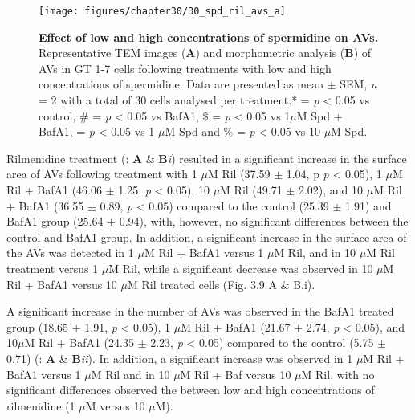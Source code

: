 {\begin{landscape}
\begin{figure}[!htbp]
\center
  \texttt{[image: figures/chapter30/30\_spd\_ril\_avs\_a]}
  \caption[Effect of low and high concentrations of spermidine on AVs]{\textbf{Effect of low and high concentrations of spermidine on AVs.} Representative TEM images (\textbf{A}) and morphometric analysis (\textbf{B}) of AVs in GT 1-7 cells following treatments with low and high concentrations of spermidine. Data are presented as mean $\pm$ SEM, \textit{n} = 2 with a total of 30 cells analysed per treatment.* = \textit{p} < 0.05 vs control, \# = \textit{p} < 0.05 vs BafA1, \$ = \textit{p} < 0.05 vs 1$\mu$M Spd + BafA1, \@ = \textit{p} < 0.05 vs 1 $\mu$M Spd and  \% = \textit{p} < 0.05 vs 10 $\mu$M Spd.}
  \label{fig:30_spd_ril_avs_a}
\end{figure} 
\end{landscape}

Rilmenidine treatment (: \textbf{A} \& \textbf{B}\textit{i}) resulted in a significant increase in the surface area of AVs following treatment with 1 $\mu$M Ril (37.59 $\pm$ 1.04, p \textit{p} < 0.05), 1 $\mu$M Ril + BafA1 (46.06 $\pm$ 1.25, \textit{p} < 0.05), 10 $\mu$M Ril (49.71 $\pm$ 2.02), and 10 $\mu$M Ril + BafA1 (36.55 $\pm$ 0.89, \textit{p} < 0.05) compared to the control (25.39 $\pm$ 1.91) and BafA1 group (25.64 $\pm$ 0.94), with, however, no significant differences between the control and BafA1 group. In addition, a significant increase in the surface area of the AVs was detected in 1 $\mu$M Ril + BafA1 versus 1 $\mu$M Ril, and in 10 $\mu$M Ril treatment versus 1 $\mu$M Ril, while a significant decrease was observed in 10 $\mu$M Ril + BafA1 versus 10 $\mu$M Ril  treated cells (Fig. 3.9 A \& B.i).

A significant increase in the number of AVs was observed in the BafA1 treated group (18.65 $\pm$ 1.91, \textit{p} < 0.05), 1 $\mu$M Ril + BafA1 (21.67 $\pm$ 2.74, \textit{p} < 0.05), and 10$\mu$M Ril + BafA1 (24.35 $\pm$ 2.23, \textit{p} < 0.05) compared to the control (5.75 $\pm$ 0.71) (: \textbf{A} \& \textbf{B}\textit{ii}). In addition, a significant increase was observed in 1 $\mu$M Ril + BafA1 versus 1 $\mu$M Ril and in 10 $\mu$M Ril + Baf versus 10 $\mu$M Ril, with no significant differences observed the between low and high concentrations of rilmenidine (1 $\mu$M versus 10 $\mu$M).

}
